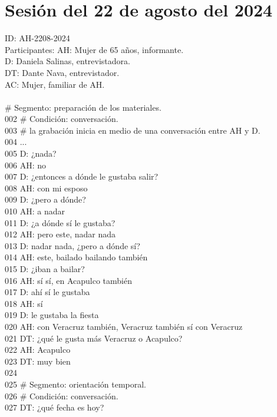 \section{Sesión del 22 de agosto del 2024}
\noindent
ID: AH-2208-2024\\
Participantes:
AH: Mujer de 65 años, informante.\\
D: Daniela Salinas, entrevistadora.\\
DT: Dante Nava, entrevistador.\\
AC: Mujer, familiar de AH.\\
\\

 \# Segmento: preparación de los materiales.\\
002 \# Condición: conversación.\\
003 \# la grabación inicia en medio de una conversación entre AH y D.\\
004 ...\\
005 D: ¿nada?\\
006 AH: no\\
007 D: ¿entonces a dónde le gustaba salir?\\
008 AH: con mi esposo\\
009 D: ¿pero a dónde?\\
010 AH: a nadar\\
011 D: ¿a dónde sí le gustaba?\\
012 AH: pero este, nadar nada\\
013 D: nadar nada, ¿pero a dónde sí?\\
014 AH: este, bailado bailando también\\
015 D: ¿iban a bailar?\\
016 AH: sí sí, en Acapulco también\\
017 D: ahí sí le gustaba\\
018 AH: sí\\
019 D: le gustaba la fiesta\\
020 AH: con Veracruz también, Veracruz también sí con Veracruz\\
021 DT: ¿qué le gusta más Veracruz o Acapulco?\\
022 AH: Acapulco\\
023 DT: muy bien\\
024 \\
025 \# Segmento: orientación temporal.\\
026 \# Condición: conversación.\\
027 DT: ¿qué fecha es hoy?\\
